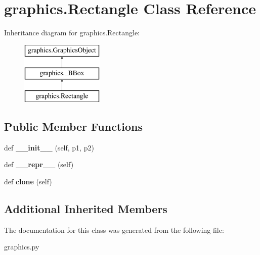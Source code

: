 \hypertarget{classgraphics_1_1_rectangle}{}\section{graphics.\+Rectangle Class Reference}
\label{classgraphics_1_1_rectangle}
Inheritance diagram for graphics.\+Rectangle\+:\begin{figure}[H]
\begin{center}
\leavevmode
\includegraphics[height=3.000000cm]{classgraphics_1_1_rectangle}
\end{center}
\end{figure}
\subsection*{Public Member Functions}
\begin{DoxyCompactItemize}
\item 
def {\bfseries \+\_\+\+\_\+init\+\_\+\+\_\+} (self, p1, p2)\hypertarget{classgraphics_1_1_rectangle_a691f947134b1fc54443c55aa9d6214c5}{}\label{classgraphics_1_1_rectangle_a691f947134b1fc54443c55aa9d6214c5}

\item 
def {\bfseries \+\_\+\+\_\+repr\+\_\+\+\_\+} (self)\hypertarget{classgraphics_1_1_rectangle_af16c7826cc639912ec3ef819f6ac467e}{}\label{classgraphics_1_1_rectangle_af16c7826cc639912ec3ef819f6ac467e}

\item 
def {\bfseries clone} (self)\hypertarget{classgraphics_1_1_rectangle_aaffe12a1bc2f5fc5ff221c909d2fb583}{}\label{classgraphics_1_1_rectangle_aaffe12a1bc2f5fc5ff221c909d2fb583}

\end{DoxyCompactItemize}
\subsection*{Additional Inherited Members}


The documentation for this class was generated from the following file\+:\begin{DoxyCompactItemize}
\item 
graphics.\+py\end{DoxyCompactItemize}
